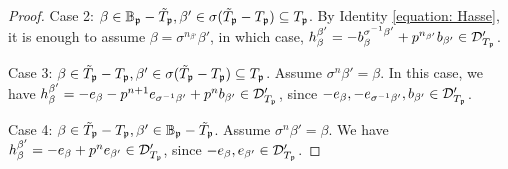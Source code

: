 \documentclass[10pt,a4paper]{amsart}
\def\BB{\mathbb{B}}
\newcommand{\calD}{{\mathcal{D}}}
\newcommand{\gerp}{{\frak{p}}}
\begin{document}
\begin{proof}
\vspace{2mm}

\noindent Case 2: $\beta \in \BB_\gerp-\tilde{T}_\gerp, \beta' \in \sigma(\tilde{T}_\gerp-T_\gerp)\subseteq T_\gerp$. By Identity \ref{equation: Hasse}, it is enough to assume $\beta=\sigma^{n_{\beta'}}{\beta'}$, in which case, $h_\beta^{\beta'}=-b_\beta^{\sigma^{-1}\beta'} +p^{n_{\beta'}}b_{\beta'} \in \calD'_{T_\gerp}$.

\vspace{2mm}

\noindent Case 3: $\beta \in \tilde{T}_\gerp-T_\gerp, \beta' \in \sigma(\tilde{T}_\gerp-T_\gerp)\subseteq T_\gerp$. Assume $\sigma^n\beta'=\beta$. In this case, we  have $h_\beta^{\beta'}=-e_\beta-p^{n+1}e_{\sigma^{-1}\beta'}+p^nb_{\beta'} \in \calD'_{T_\gerp}$, since $-e_\beta, -e_{\sigma^{-1}\beta'}, b_{\beta'} \in \calD'_{T_\gerp}$.

\vspace{2mm}

\noindent Case 4: $\beta \in \tilde{T}_\gerp-T_\gerp, \beta' \in {\BB}_\gerp-\tilde{T}_\gerp$. Assume $\sigma^n\beta'=\beta$. We have $h_\beta^{\beta'}=-e_{\beta}+ p^ne_{\beta'} \in \calD'_{T_\gerp}$, since $-e_\beta, e_{\beta'} \in \calD'_{T_\gerp}$.
   \end{proof}
\end{document}
